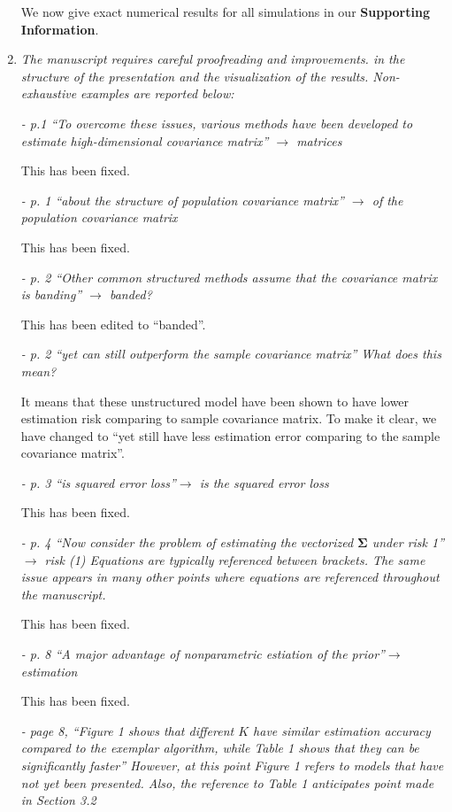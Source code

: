 \documentclass[12pt]{article}
\begin{document}
\begin{enumerate}
  We now give exact numerical results for all simulations in our \textbf{Supporting Information}.

  
\item \emph{The manuscript requires careful proofreading and improvements. in the structure of the presentation and the visualization of the results. Non-exhaustive examples are reported below:}

\emph{- p.1 “To overcome these issues, various methods have been developed to estimate high-dimensional covariance matrix” $\to$ matrices}

This has been fixed.

\emph{- p. 1 “about the structure of population covariance matrix” $\to$ of the population covariance matrix}

This has been fixed.

\emph{- p. 2 “Other common structured methods assume that the covariance matrix is banding” $\to$ banded?}

This has been edited to ``banded''.

\emph{- p. 2 “yet can still outperform the sample covariance matrix” What does this mean?}

It means that these unstructured model have been shown to have lower estimation risk comparing to sample covariance matrix. To make it clear, we have changed to ``yet still have less estimation error comparing to the sample covariance matrix''. 

\emph{- p. 3 “is squared error loss”$\to$ is the squared error loss}

This has been fixed.

\emph{- p. 4 “Now consider the problem of estimating the vectorized $\boldsymbol{\Sigma}$ under risk 1” $\to$ risk (1) Equations are typically referenced between brackets. The same issue appears in many other points where equations are referenced throughout the manuscript.}

This has been fixed.

\emph{- p. 8 “A major advantage of nonparametric estiation of the prior”$\to$ estimation}

This has been fixed.

\emph{- page 8, “Figure 1 shows that different $K$ have similar estimation accuracy compared to the exemplar algorithm, while Table 1 shows that they can be significantly faster” However, at this point Figure 1 refers to models that have not yet been presented. Also, the reference to Table 1 anticipates point made in Section 3.2}


\end{enumerate}
\end{document}
